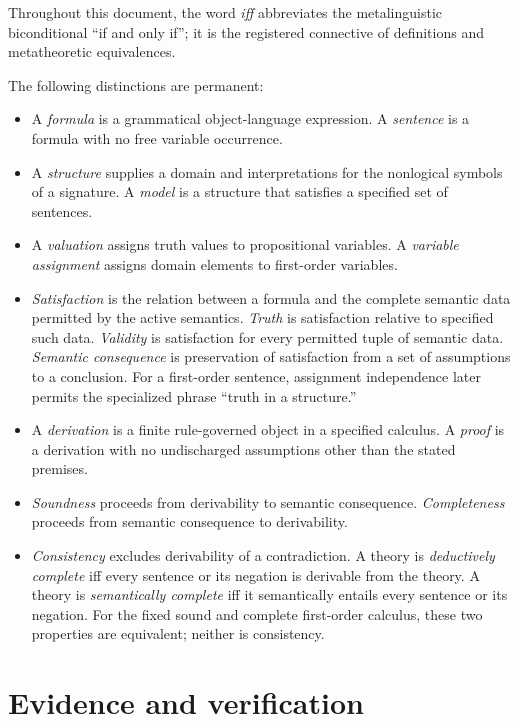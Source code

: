 \documentclass[11pt,oneside,openany]{book}
\theoremstyle{definition}
\theoremstyle{plain}
\theoremstyle{remark}
\begin{document}
Throughout this document, the word \emph{iff} abbreviates the
metalinguistic biconditional ``if and only if''; it is the registered
connective of definitions and metatheoretic equivalences.

The following distinctions are permanent:
\begin{itemize}
  \item A \emph{formula} is a grammatical object-language expression.  A
        \emph{sentence} is a formula with no free variable occurrence.
  \item A \emph{structure} supplies a domain and interpretations for the
        nonlogical symbols of a signature.  A \emph{model} is a structure that
        satisfies a specified set of sentences.
  \item A \emph{valuation} assigns truth values to propositional variables.  A
        \emph{variable assignment} assigns domain elements to first-order
        variables.
  \item \emph{Satisfaction} is the relation between a formula and the complete
        semantic data permitted by the active semantics.  \emph{Truth} is
        satisfaction relative to specified such data.  \emph{Validity} is
        satisfaction for every permitted tuple of semantic data.
        \emph{Semantic consequence} is preservation of satisfaction from a set
        of assumptions to a conclusion.  For a first-order sentence, assignment
        independence later permits the specialized phrase ``truth in a
        structure.''
  \item A \emph{derivation} is a finite rule-governed object in a specified
        calculus.  A \emph{proof} is a derivation with no undischarged
        assumptions other than the stated premises.
  \item \emph{Soundness} proceeds from derivability to semantic consequence.
        \emph{Completeness} proceeds from semantic consequence to derivability.
  \item \emph{Consistency} excludes derivability of a contradiction.
        A theory is \emph{deductively complete} iff every sentence or its
        negation is derivable from the theory.  A theory is
        \emph{semantically complete} iff it semantically entails every sentence
        or its negation.  For the fixed sound and complete first-order calculus,
        these two properties are equivalent; neither is consistency.
\end{itemize}

\section*{Evidence and verification}
\end{document}
